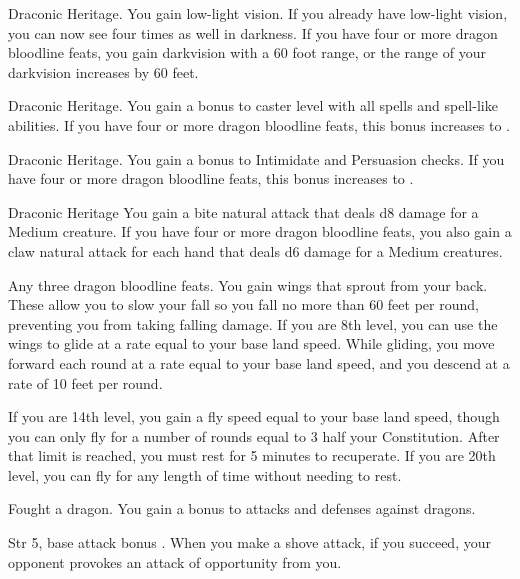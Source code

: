  Draconic Heritage.
 You gain low-light vision. If you already have low-light vision, you can now see four times as well in darkness. If you have four or more dragon bloodline feats, you gain darkvision with a 60 foot range, or the range of your darkvision increases by 60 feet.

 Draconic Heritage.
 You gain a  bonus to caster level with all spells and spell-like abilities. If you have four or more dragon bloodline feats, this bonus increases to .

 Draconic Heritage.
 You gain a  bonus to Intimidate and Persuasion checks. If you have four or more dragon bloodline feats, this bonus increases to .

 Draconic Heritage
 You gain a bite natural attack that deals d8 damage for a Medium creature. If you have four or more dragon bloodline feats, you also gain a claw natural attack for each hand that deals d6 damage for a Medium creatures.

 Any three dragon bloodline feats.
 You gain wings that sprout from your back. These allow you to slow your fall so you fall no more than 60 feet per round, preventing you from taking falling damage. If you are 8th level, you can use the wings to glide at a rate equal to your base land speed. While gliding, you move forward each round at a rate equal to your base land speed, and you descend at a rate of 10 feet per round.

If you are 14th level, you gain a fly speed equal to your base land speed, though you can only fly for a number of rounds equal to 3 \add half your Constitution. After that limit is reached, you must rest for 5 minutes to recuperate. If you are 20th level, you can fly for any length of time without needing to rest.

\featpre Fought a dragon.
\featben You gain a  bonus to attacks and defenses against dragons.
\featspecial \featbanenotes

\featpre Str 5, base attack bonus .
\featben When you make a shove attack, if you succeed, your opponent provokes an attack of opportunity from you.


